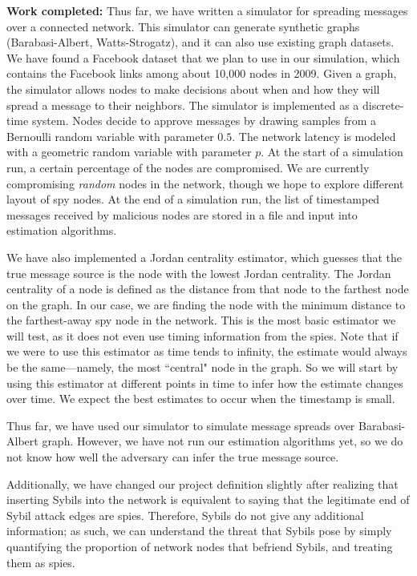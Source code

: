 \documentclass[11pt, onecolumn]{article}
\begin{document}
\vspace{0.1in}
\textbf{Work completed:} Thus far, we have written a simulator for spreading messages over a connected network. This simulator can generate synthetic graphs (Barabasi-Albert, Watts-Strogatz), and it can also use existing graph datasets. We have found a Facebook dataset that we plan to use in our simulation, which contains the Facebook links among about 10,000 nodes in 2009. Given a graph, the simulator allows nodes to make decisions about when and how they will spread a message to their neighbors. 
The simulator is implemented as a discrete-time system. Nodes decide to approve messages by drawing samples from a Bernoulli random variable with parameter $0.5$. The network latency is modeled with a geometric random variable with parameter $p$. 
At the start of a simulation run, a certain percentage of the nodes are compromised. We are currently compromising \emph{random} nodes in the network, though we hope to explore different layout of spy nodes. 
At the end of a simulation run, the list of timestamped messages received by malicious nodes are stored in a file and input into estimation algorithms.

We have also implemented a Jordan centrality estimator, which guesses that the true message source is the node with the lowest Jordan centrality. The Jordan centrality of a node is defined as the distance from that node to the farthest node on the graph. In our case, we are finding the node with the minimum distance to the farthest-away spy node in the network. This is the most basic estimator we will test, as it does not even use timing information from the spies. Note that if we were to use this estimator as time tends to infinity, the estimate would always be the same---namely, the most ``central" node in the graph. So we will start by using this estimator at different points in time to infer how the estimate changes over time. We expect the best estimates to occur when the timestamp is small.

Thus far, we have used our simulator to simulate message spreads over Barabasi-Albert graph. However, we have not run our estimation algorithms yet, so we do not know how well the adversary can infer the true message source.

Additionally, we have changed our project definition slightly after realizing that inserting Sybils into the network is equivalent to saying that the legitimate end of Sybil attack edges are spies. Therefore, Sybils do not give any additional information; as such, we can understand the threat that Sybils pose by simply quantifying the proportion of network nodes that befriend Sybils, and treating them as spies. 
\end{document}
